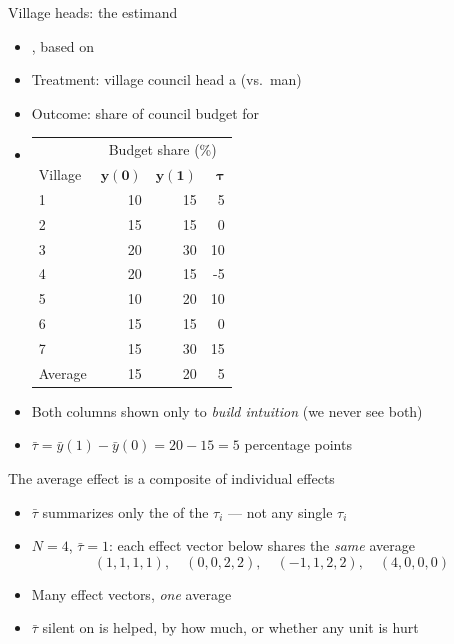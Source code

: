 \documentclass[table, xcolor = {dvipsnames}, 9pt]{beamer}
\theoremstyle{plain}
\newcommand{\mh}[1]{{\color{magenta}{#1}}}
\begin{document}
\begin{frame}[t]{Village heads: the estimand}
\vfill
\begin{itemize}
\item {\small \citet[Ch.~2]{gerbergreen2012}, based on \citet{chattopadhyayduflo2004}} \vfill
\item Treatment: village council head a \mh{woman} (vs.\ man) \vfill
\item Outcome: share of council budget for \mh{clean drinking water} \vfill
\item[]
\begin{center}
\small
\begin{tabular}{l|rrr} \hline
& \multicolumn{3}{c}{Budget share (\%)} \\
Village &$\bm{y}(\bm{0})$& $\bm{y}(\bm{1})$& $\bm{\tau}$  \\ \hline
1& 10 & 15  & 5  \\
2& 15 & 15  & 0   \\
3& 20 & 30  & 10   \\
4& 20 & 15  & -5   \\
5& 10 & 20  & 10   \\
6& 15 & 15  & 0   \\
7& 15 & 30  & 15   \\ \hline
Average & 15 & 20 & 5  \\ \hline
\end{tabular}
\end{center}
\vspace{0.8em}
\item Both columns shown only to \emph{build intuition} (we never see both) \vfill
\item[] $\bar{\tau} = \bar{y}(1) - \bar{y}(0) = 20 - 15 = 5$ percentage points \vfill
\end{itemize} \vfill
\end{frame}
\begin{frame}[t]{The average effect is a composite of individual effects}
\vfill
\begin{itemize} \vfill
\item $\bar{\tau}$ summarizes only the \mh{mean} of the $\tau_i$ --- not any single $\tau_i$ \vfill
\item $N = 4$, $\bar{\tau} = 1$: each effect vector below shares the \emph{same} average
\begin{equation*}
(1,1,1,1), \quad (0,0,2,2), \quad (-1,1,2,2), \quad (4,0,0,0)
\end{equation*} \vfill
\item Many \mh{different} effect vectors, \emph{one} average \vfill
\item $\bar{\tau}$ silent on \mh{who} is helped, by how much, or whether any unit is hurt \vfill
\end{itemize} \vfill
\end{frame}
\end{document}
